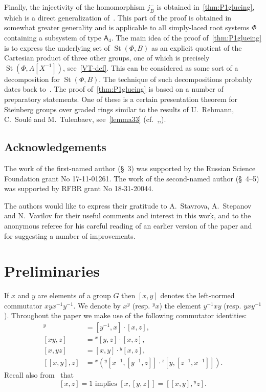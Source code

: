 \documentclass[oneside, 8pt]{amsart}
\theoremstyle{remark}
\theoremstyle{definition}
\numberwithin{lemma}{section}
\numberwithin{prop}{section}
\numberwithin{corollary}{section}
\numberwithin{externaltheorem}{section}
\DeclareMathOperator{\St}{St}
\newcommand{\inv}{^{-1}}
\newcommand{\rA}{\mathsf{A}}
\numberwithin{equation}{section}
\begin{document}
Finally, the injectivity of the homomorphism $j_B^-$ is obtained in~\cref{thm:P1glueing}, which is a direct generalization of~\cite[Proposition~4.3]{Tu83}. This part of the proof is obtained in somewhat greater generality and is applicable to all simply-laced root systems $\Phi$ containing a subsystem of type $\rA_4$. The main idea of the proof of~\cref{thm:P1glueing} is to express the underlying set of $\St(\Phi, B)$ as an explicit quotient of the Cartesian product of three other groups, one of which is precisely $\St(\Phi, A[X\inv])$, see~\eqref{VT-def}. This can be considered as some sort of a decomposition for $\St(\Phi, B)$. The technique of such decompositions probably dates back to~\cite{ST76}.
The proof of~\cref{thm:P1glueing} is based on a number of preparatory statements. One of these is a certain presentation theorem for Steinberg groups over graded rings similar to the results of U.~Rehmann, C.~Soul{\'e} and M.~Tulenbaev, see~\cref{lemma33} (cf.~\cite[Satz~2]{Re75},\cite[Theorem~2]{RS76},\cite[Lemma~3.3]{Tu83}).
\subsection{Acknowledgements} 
The work of the first-named author (\S~3) was supported by the Russian Science Foundation grant No 17-11-01261. 
The work of the second-named author (\S~4--5) was supported by RFBR grant No 18-31-20044.

The authors would like to express their gratitude to A.~Stavrova, A.~Stepanov and N.~Vavilov for their useful comments and interest in this work, and to the anonymous referee for his careful reading of an earlier version of the paper and for suggesting a number of improvements.

\section{Preliminaries}
If $x$ and $y$ are elements of a group $G$ then $[x, y]$ denotes the left-normed commutator $xyx^{-1}y^{-1}$.
We denote by $x^y$ (resp. ${}^y\!x$) the element $y^{-1}xy$ (resp. $yxy^{-1}$). 
Throughout the paper we make use of the following commutator identities:
\begin{align}
 [x, yz]^y               & =   [y^{-1}, x] \cdot [x, z], \label{rel43} \\ 
 \label{eq:H1ii} [xy, z] & =   {}^x[y, z] \cdot [x,z], \\
 \label{eq:H1ii-2}[x, yz]& =   [x, y] \cdot {}^{y}\![x, z], \\
 [[x, y], z] & =   {}^{x}\!\left({}^{y}[x^{-1}, [ y^{-1}, z]] \cdot {}^z[y, [ z^{-1}, x^{-1}]] \right). \label{HW-variant} \end{align}
Recall also from~\cite[Lemma~3.1.1]{RS76} that
\begin{equation} \label{eq:H1iii} [x,z] = 1 \text{ implies } [x, [y,z]] = [[x,y],{}^yz]. \end{equation} 
\end{document}
